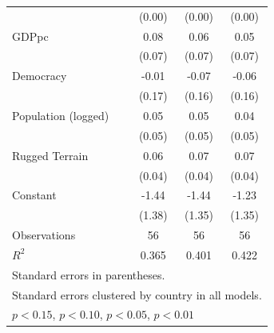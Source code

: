 \documentclass[12pt, letterpaper]{article}
\begin{document}
\begin{table}[htbp]
\begin{small}
\begin{tabular}{l*{3}{c}}
                    &      (0.00)         &      (0.00)         &      (0.00)         \\
GDPpc               &        0.08         &        0.06         &        0.05         \\
                    &      (0.07)         &      (0.07)         &      (0.07)         \\
Democracy           &       -0.01         &       -0.07         &       -0.06         \\
                    &      (0.17)         &      (0.16)         &      (0.16)         \\
Population (logged) &        0.05         &        0.05         &        0.04         \\
                    &      (0.05)         &      (0.05)         &      (0.05)         \\
Rugged Terrain      &        0.06         &        0.07\sym{+}  &        0.07\sym{+}  \\
                    &      (0.04)         &      (0.04)         &      (0.04)         \\
Constant            &       -1.44         &       -1.44         &       -1.23         \\
                    &      (1.38)         &      (1.35)         &      (1.35)         \\
\hline
Observations        &          56         &          56         &          56         \\
\(R^{2}\)           &       0.365         &       0.401         &       0.422         \\
\hline\hline
\multicolumn{4}{l}{\footnotesize Standard errors in parentheses.}\\
\multicolumn{4}{l}{\footnotesize Standard errors clustered by country in all models.}\\
\multicolumn{4}{l}{\footnotesize \sym{+} \(p<0.15\), \sym{*} \(p<0.10\), \sym{**} \(p<0.05\), \sym{***} \(p<0.01\)}\\
\end{tabular}
\end{small}
\end{table}
\end{document}
